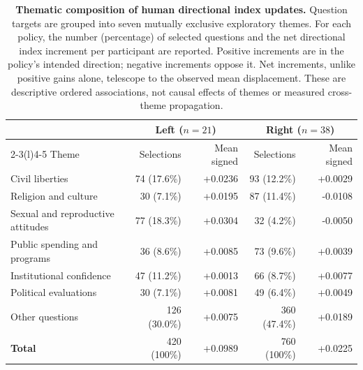 \begin{table}[!t]
\centering
\caption{\textbf{Thematic composition of human directional index updates.} Question targets are grouped into seven mutually exclusive exploratory themes. For each policy, the number (percentage) of selected questions and the net directional index increment per participant are reported. Positive increments are in the policy's intended direction; negative increments oppose it. Net increments, unlike positive gains alone, telescope to the observed mean displacement. These are descriptive ordered associations, not causal effects of themes or measured cross-theme propagation.}
\label{tab:nhb-theme-policy}
\small
\setlength{\tabcolsep}{4pt}
\begin{tabularx}{\linewidth}{@{}Xrrrr@{}}
\toprule
 & \multicolumn{2}{c}{Left ($n=21$)} & \multicolumn{2}{c}{Right ($n=38$)} \\
\cmidrule(lr){2-3}\cmidrule(l){4-5}
Theme & Selections & Mean signed & Selections & Mean signed \\
\midrule
Civil liberties & 74 (17.6\%) & +0.0236 & 93 (12.2\%) & +0.0029 \\
Religion and culture & 30 (7.1\%) & +0.0195 & 87 (11.4\%) & -0.0108 \\
Sexual and reproductive attitudes & 77 (18.3\%) & +0.0304 & 32 (4.2\%) & -0.0050 \\
Public spending and programs & 36 (8.6\%) & +0.0085 & 73 (9.6\%) & +0.0039 \\
Institutional confidence & 47 (11.2\%) & +0.0013 & 66 (8.7\%) & +0.0077 \\
Political evaluations & 30 (7.1\%) & +0.0081 & 49 (6.4\%) & +0.0049 \\
Other questions & 126 (30.0\%) & +0.0075 & 360 (47.4\%) & +0.0189 \\
\midrule
\textbf{Total} & 420 (100\%) & +0.0989 & 760 (100\%) & +0.0225 \\
\bottomrule
\end{tabularx}
\end{table}
